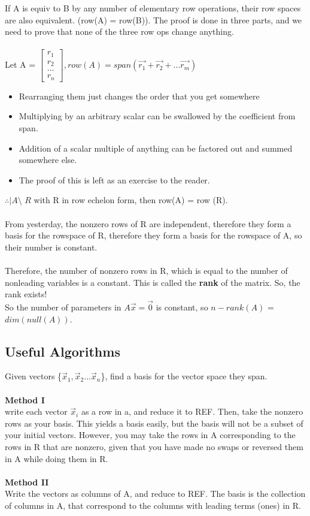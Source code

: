 \documentclass[10pt, twocolumn]{report}
\begin{document}
If A is equiv to B by any number of elementary row operations, their row spaces are also equivalent. (row(A) = row(B)). The proof is done in three parts, and we need to prove that none of the three row ops change anything. \\\\ Let A = $\begin{bmatrix} r_1 \\ r_2 \\ ... \\ r_n \end{bmatrix}, row(A) = span(\vec{r_1} + \vec{r_2} + ... \vec{r_m})$
\begin{itemize}
  \item Rearranging them just changes the order that you get somewhere
  \item Multiplying by an arbitrary scalar can be swallowed by the coefficient from span.
  \item Addition of a scalar multiple of anything can be factored out and summed somewhere else.
  \item The proof of this is left as an exercise to the reader.
\end{itemize}
$\therefore |A\text{\char `\~} R$ with R in row echelon form, then row(A) = row (R). \\\\ From yesterday, the nonzero rows of R are independent, therefore they form a basis for the rowspace of R, therefore they form a basis for the rowspace of A, so their number is constant. \\\\ Therefore, the number of nonzero rows in R, which is equal to the number of nonleading variables is a constant. This is called the \textbf{rank} of the matrix. So, the rank exists!\\

So the number of parameters in $A\vec{x} = \vec{0}$ is constant, so $n-rank(A)$ = $dim(null(A))$.

\subsection {Useful Algorithms}
Given vectors \{$\vec x_1, \vec x_2 ... \vec x_n$\}, find a basis for the vector space they span. \\\\ \textbf{Method I}\\
write each vector $\vec x_i$ as a row in a, and reduce it to REF. Then, take the nonzero rows as your basis. This yields a basis easily, but the basis will not be a subset of your initial vectors. However, you may take the rows in A corresponding to the rows in R that are nonzero, given that you have made no swaps or reversed them in A while doing them in R. \\\\
 \textbf{Method II}\\
 Write the vectors as columns of A, and reduce to REF. The basis is the collection of columns in A, that correspond to the columns with leading terms (ones) in R. \\\\
\end{document}
